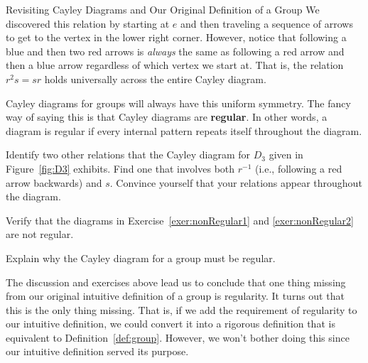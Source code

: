 \begin{section}{Revisiting Cayley Diagrams and Our Original Definition of a Group}
We discovered this relation by starting at $e$ and then traveling a sequence of arrows to get to the vertex in the lower right corner.  However, notice that following a blue and then two red arrows is \emph{always} the same as following a red arrow and then a blue arrow regardless of which vertex we start at.  That is, the relation $r^2s=sr$ holds universally across the entire Cayley diagram.

Cayley diagrams for groups will always have this uniform symmetry.  The fancy way of saying this is that Cayley diagrams are \textbf{regular}.  In other words, a diagram is regular if every internal pattern repeats itself throughout the diagram.

\begin{exercise}
Identify two other relations that the Cayley diagram for $D_3$ given in Figure~\ref{fig:D3} exhibits.  Find one that involves both $r^{-1}$ (i.e., following a red arrow backwards) and $s$.  Convince yourself that your relations appear throughout the diagram.
\end{exercise}

\begin{exercise}
Verify that the diagrams in Exercise~\ref{exer:nonRegular1} and \ref{exer:nonRegular2} are not regular.
\end{exercise}

\begin{problem}
Explain why the Cayley diagram for a group must be regular.
\end{problem}

The discussion and exercises above lead us to conclude that one thing missing from our original intuitive definition of a group is regularity.  It turns out that this is the only thing missing.  That is, if we add the requirement of regularity to our intuitive definition, we could convert it into a rigorous definition that is equivalent to Definition~\ref{def:group}.  However, we won't bother doing this since our intuitive definition served its purpose.

\end{section}

